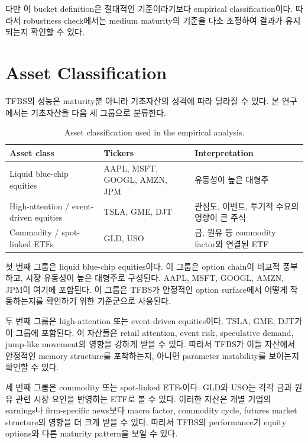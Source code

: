 \documentclass[11pt,a4paper]{report}
\begin{document}
다만 이 bucket definition은 절대적인 기준이라기보다 empirical classification이다. 따라서 robustness check에서는 medium maturity의 기준을 다소 조정하여 결과가 유지되는지 확인할 수 있다.

\section{Asset Classification}

TFBS의 성능은 maturity뿐 아니라 기초자산의 성격에 따라 달라질 수 있다. 본 연구에서는 기초자산을 다음 세 그룹으로 분류한다.

\begin{table}[htbp]
\centering
\small
\begin{tabularx}{\textwidth}{
@{}
>{\raggedright\arraybackslash}p{}
>{\raggedright\arraybackslash}p{}
>{\raggedright\arraybackslash}X
@{}
}
\toprule
Asset class & Tickers & Interpretation \\
\midrule
Liquid blue-chip equities
& AAPL, MSFT, GOOGL, AMZN, JPM
& 유동성이 높은 대형주 \\
\midrule
High-attention / event-driven equities
& TSLA, GME, DJT
& 관심도, 이벤트, 투기적 수요의 영향이 큰 주식 \\
\midrule
Commodity / spot-linked ETFs
& GLD, USO
& 금, 원유 등 commodity factor와 연결된 ETF \\
\bottomrule
\end{tabularx}
\caption{Asset classification used in the empirical analysis.}
\label{tab:asset_classification}
\end{table}

첫 번째 그룹은 liquid blue-chip equities이다. 이 그룹은 option chain이 비교적 풍부하고, 시장 유동성이 높은 대형주로 구성된다. AAPL, MSFT, GOOGL, AMZN, JPM이 여기에 포함된다. 이 그룹은 TFBS가 안정적인 option surface에서 어떻게 작동하는지를 확인하기 위한 기준군으로 사용된다.

두 번째 그룹은 high-attention 또는 event-driven equities이다. TSLA, GME, DJT가 이 그룹에 포함된다. 이 자산들은 retail attention, event risk, speculative demand, jump-like movement의 영향을 강하게 받을 수 있다. 따라서 TFBS가 이들 자산에서 안정적인 memory structure를 포착하는지, 아니면 parameter instability를 보이는지 확인할 수 있다.

세 번째 그룹은 commodity 또는 spot-linked ETFs이다. GLD와 USO는 각각 금과 원유 관련 시장 요인을 반영하는 ETF로 볼 수 있다. 이러한 자산은 개별 기업의 earnings나 firm-specific news보다 macro factor, commodity cycle, futures market structure의 영향을 더 크게 받을 수 있다. 따라서 TFBS의 performance가 equity options와 다른 maturity pattern을 보일 수 있다.
\end{document}
